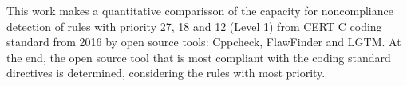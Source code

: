 This work makes a quantitative comparisson of the capacity for noncompliance detection of rules with priority 27, 18 and 12 (Level 1) from CERT C coding standard from 2016 by open source tools: Cppcheck, FlawFinder and LGTM. At the end, the open source tool that is most compliant with the coding standard directives is determined, considering the rules with most priority.
